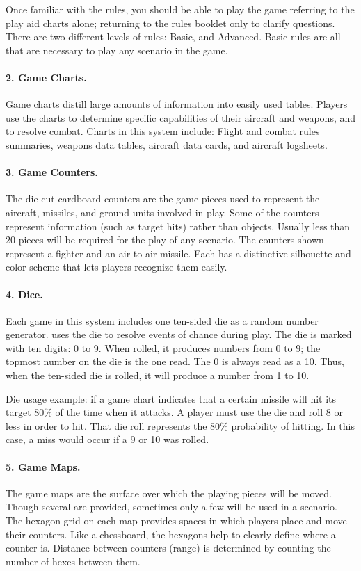Once familiar with the rules, you should be able to play the game referring to the play aid charts alone; returning to the rules booklet only to clarify questions. There are two different levels of rules: Basic, and Advanced. Basic rules are all that are necessary to play any scenario in the game.

\paragraph{2. Game Charts.} Game charts distill large amounts of information into easily used tables. Players use the charts to determine specific capabilities of their aircraft and weapons, and to resolve combat. Charts in this system include: Flight and combat rules summaries, weapons data tables, aircraft data cards, and aircraft logsheets.

\paragraph{3. Game Counters.} The die-cut cardboard counters are the game pieces used to represent the aircraft, missiles, and ground units involved in play. Some of the counters represent information (such as target hits) rather than objects. Usually less than 20 pieces will be required for the play of any scenario. The counters shown  represent a fighter and an air to air missile. Each has a distinctive silhouette and color scheme that lets players recognize them easily.

\paragraph{4. Dice.} Each game in this system includes one ten-sided die as a random number generator. {\AirPow} uses the die to resolve events of chance during play. The die is marked with ten digits: 0 to 9. When rolled, it produces numbers from 0 to 9; the topmost number on the die is the one read. The 0 is always read as a 10. Thus, when the ten-sided die is rolled, it will produce a number from 1 to 10.

Die usage example: if a game chart indicates that a certain missile will hit its target 80\% of the time when it attacks. A player must use the die and roll 8 or less in order to hit. That die roll represents the 80\% probability of hitting. In this case, a miss would occur if a 9 or 10 was rolled.

\paragraph{5. Game Maps.} The game maps are the surface over which the playing pieces will be moved. Though several are provided, sometimes only a few will be used in a scenario. The hexagon grid on each map provides spaces in which players place and move their counters. Like a chessboard, the hexagons help to clearly define where a counter is. Distance between counters (range) is determined by counting the number of hexes between them. 

